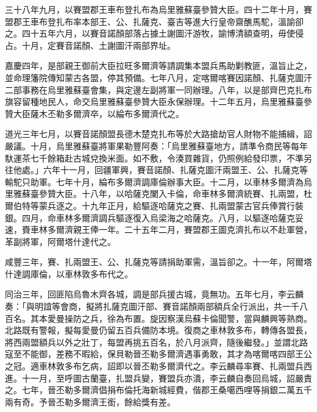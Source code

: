 \begin{pinyinscope}
三十八年九月，以賽盟郡王車布登扎布為烏里雅蘇臺參贊大臣。四十二年十月，賽盟郡王車布登扎布率本部王、公、扎薩克、臺吉等進大行皇帝齋醮馬駝，溫諭卻之。四十五年六月，以賽音諾顏部落占據土謝圖汗游牧，諭博清額查明，毋使侵占。十月，定賽音諾顏、土謝圖汗兩部界址。

嘉慶四年，是部親王御前大臣拉旺多爾濟等請調集本盟兵馬助剿教匪，溫旨止之，並命理籓院傳知蒙古各盟，停其預備。七年八月，定喀爾喀賽因諾顏、扎薩克圖汗二部事務在烏里雅蘇臺會集，與定邊左副將軍一同辦理。八年，以是部齊巴克扎布旗容留種地民人，命交烏里雅蘇臺參贊大臣永保辦理。十二年五月，烏里雅蘇臺參贊大臣薩木丕勒多爾濟卒，以綸布多爾濟代之。

道光三年七月，以賽音諾顏盟長德木楚克扎布等於大路搶劫官人財物不能捕緝，詔嚴議。十月，烏里雅蘇臺將軍果勒豐阿奏：「烏里雅蘇臺地方，請準令商民等每年馱運茶七千餘箱赴古城兌換米面。如不敷，令湊買雜貨，仍照例給發印票，不準另往他處。」六年十一月，回疆軍興，賽音諾顏、扎薩克圖汗兩盟王、公、扎薩克等輸駝只助軍。七年十月，綸布多爾濟調庫倫辦事大臣。十二月，以車林多爾濟為烏里雅蘇臺參贊大臣。十八年，以哈薩克闌入卡倫，命車林多爾濟統賽、扎兩盟，杜爾伯特等蒙兵逐之。十九年正月，給驅逐哈薩克之賽、扎兩盟蒙古官兵俸賞行裝銀。四月，命車林多爾濟調兵驅逐復入烏梁海之哈薩克。八月，以驅逐哈薩克妥速，賚車林多爾濟親王俸一年。二十五年二月，賽盟郡王圖克濟扎布以不赴軍營，革副將軍，阿爾塔什達代之。

咸豐三年，賽、扎兩盟王、公、扎薩克等請捐助軍需，溫旨卻之。十一年，阿爾塔什達調庫倫，以車林敦多布代之。

同治三年，回匪陷烏魯木齊各城，調是部兵援古城，竟無功。五年七月，李云麟奏：「與明誼等會商，擬將扎薩克圖汗部、賽音諾顏兩部額兵全行派出，共一千八百名。其本愛曼操防之兵，徐為布置。旋因察漢烏蘇卡倫聞警，當與麟興等熟商。北路既有警報，擬每愛曼仍留五百兵備防本境。復商之車林敦多布，轉傳各盟長，將西兩盟額兵以外之壯丁，每盟再挑五百名，於八月派齊，隨後繼發。」並謂北路寇至不能御，差務不暇給，保貝勒晉丕勒多爾濟遇事勇敢，其才為喀爾喀四部王公之冠。適車林敦多布乞病，詔即以晉丕勒多爾濟代之。李云麟尋率賽、扎兩盟兵西進。十一月，至呼圖古蘭臺，扎盟兵變，賽盟兵亦潰，李云麟自奏回烏城，詔嚴責之。七年，晉丕勒多爾濟倡捐布倫托海新城經費，偕郡王桑噶西哩等捐銀二萬五千兩有奇。予晉丕勒多爾濟王銜，餘給獎有差。


\end{pinyinscope}
